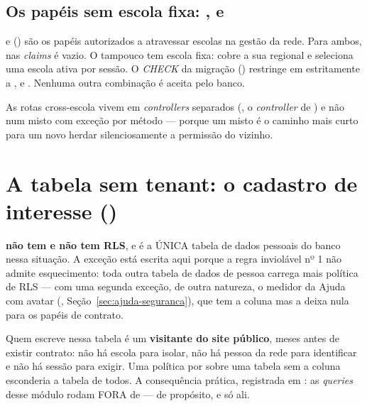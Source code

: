 \subsection{Os papéis sem escola fixa: ,  e }

\begin{regra}
 e  () são os papéis autorizados a
atravessar escolas na gestão da rede. Para ambos,  nas \emph{claims}
é vazio. O  tampouco tem escola fixa: cobre a sua regional
e seleciona uma escola ativa por sessão. O \emph{CHECK} da migração
() restringe  em
 estritamente a ,  e
. Nenhuma outra combinação é aceita pelo banco.
\end{regra}

As rotas cross-escola vivem em \emph{controllers} separados
(, o \emph{controller} de
) e não num  misto com exceção por método --- porque
um  misto é o caminho mais curto para um  novo herdar
silenciosamente a permissão do vizinho.

\section{A tabela sem tenant: o cadastro de interesse ()}

\begin{regra}
\textbf{ não tem  e não tem RLS}, e é a
ÚNICA tabela de dados pessoais do banco nessa situação. A exceção está escrita
aqui porque a regra inviolável nº 1 não admite esquecimento: toda outra tabela
de dados de pessoa carrega  mais política de RLS ---
com uma segunda exceção, de outra natureza, o medidor da Ajuda com avatar
(, Seção~\ref{sec:ajuda-seguranca}), que tem a coluna mas a
deixa nula para os papéis de contrato.
\end{regra}

Quem escreve nessa tabela é um \textbf{visitante do site público}, meses antes
de existir contrato: não há escola para isolar, não há pessoa da rede para
identificar e não há sessão para exigir. Uma política por  sobre
uma tabela sem a coluna esconderia a tabela de todos. A consequência prática,
registrada em : as \emph{queries} desse
módulo rodam FORA de  --- de propósito, e só ali.

